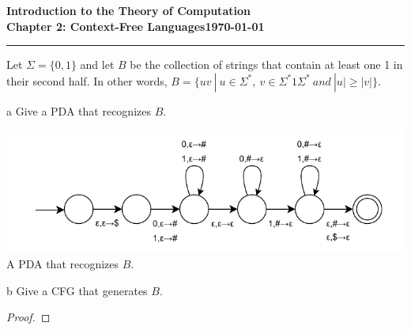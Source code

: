 \documentclass[11pt]{article}
\newcommand{\dated}{\today}
\begin{document}
\textbf{Introduction to the Theory of
Computation}\hfill\textbf{\myname}\\[0.01in]
\textbf{Chapter 2: Context-Free Languages}\hfill\textbf{\dated}\\
\smallskip\hrule\bigskip

\begin{problem}{2.47}
Let $\Sigma = \{0,1\}$ and let $B$ be the collection of strings that contain at least one 1 in their second half. In other words, $B = \{uv \ | \ u \in \Sigma^{*}, \ v \in \Sigma^{*}1\Sigma^{*} \ and \ |u| \geq |v|\}$.
\end{problem}

\begin{problem}[Part]{a}
Give a PDA that recognizes $B$.
\end{problem}

\begin{center}
\includegraphics[scale=1.4]{Figures/Problem2.47.pdf} \\
A PDA that recognizes $B$.
\end{center}

\begin{problem}[Part]{b}
Give a CFG that generates $B$.
\end{problem}

\begin{proof}
\end{proof}
\end{document}
